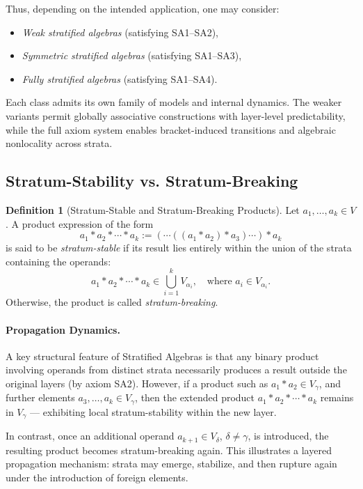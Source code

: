 \documentclass[12pt]{article}
\theoremstyle{definition}
\newtheorem{definition}{Definition}[section]
\theoremstyle{plain}
\theoremstyle{remark}
\begin{document}
Thus, depending on the intended application, one may consider:
\begin{itemize}
    \item \emph{Weak stratified algebras} (satisfying SA1–SA2),
    \item \emph{Symmetric stratified algebras} (satisfying SA1–SA3),
    \item \emph{Fully stratified algebras} (satisfying SA1–SA4).
\end{itemize}

Each class admits its own family of models and internal dynamics. The weaker variants permit globally associative constructions with layer-level predictability, while the full axiom system enables bracket-induced transitions and algebraic nonlocality across strata.

\subsection*{Stratum-Stability vs. Stratum-Breaking}

\begin{definition}[Stratum-Stable and Stratum-Breaking Products]
Let \( a_1, \ldots, a_k \in V \). A product expression of the form
\[
a_1 * a_2 * \cdots * a_k := ( \cdots ((a_1 * a_2) * a_3) \cdots ) * a_k
\]
is said to be \emph{stratum-stable} if its result lies entirely within the union of the strata containing the operands:
\[
a_1 * a_2 * \cdots * a_k \in \bigcup_{i=1}^k V_{\alpha_i}, \quad \text{where } a_i \in V_{\alpha_i}.
\]
Otherwise, the product is called \emph{stratum-breaking}.
\end{definition}

\paragraph{Propagation Dynamics.}
A key structural feature of Stratified Algebras is that any binary product involving operands from distinct strata necessarily produces a result outside the original layers (by axiom SA2). However, if a product such as \( a_1 * a_2 \in V_\gamma \), and further elements \( a_3, \dots, a_k \in V_\gamma \), then the extended product \( a_1 * a_2 * \cdots * a_k \) remains in \( V_\gamma \) — exhibiting local stratum-stability within the new layer.

In contrast, once an additional operand \( a_{k+1} \in V_\delta \), \( \delta \ne \gamma \), is introduced, the resulting product becomes stratum-breaking again. This illustrates a layered propagation mechanism: strata may emerge, stabilize, and then rupture again under the introduction of foreign elements.
\end{document}
